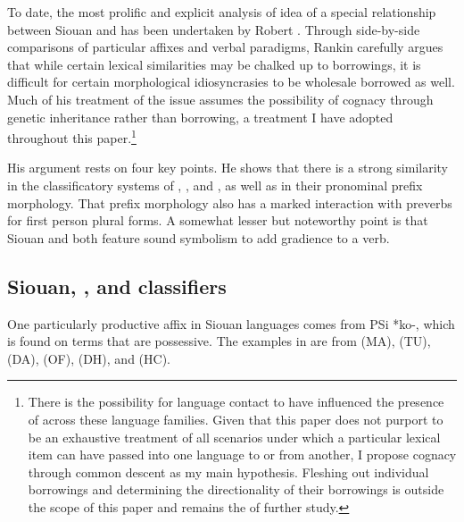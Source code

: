 \documentclass[output=paper]{LSP/langsci}
\begin{document}
To date, the most prolific and explicit analysis of  idea of a special relationship between Siouan and  has been undertaken by Robert \citet{Rankin1996,Rankin1998scy}. Through side-by-side comparisons of particular affixes and verbal paradigms, Rankin carefully argues that while certain lexical similarities may be chalked up to borrowings, it is difficult for certain morphological idiosyncrasies to be wholesale borrowed as well. Much of his treatment of the issue assumes the possibility of cognacy through genetic inheritance rather than borrowing, a treatment I have adopted throughout this paper.\footnote{There is the possibility for language contact to have influenced the presence of  across these language families. Given that this paper does not purport to be an exhaustive treatment of all scenarios under which a particular lexical item can have passed into one language to or from another, I propose cognacy through common descent as my main hypothesis. Fleshing out individual borrowings and determining the directionality of their borrowings is outside the scope of this paper and remains the  of further study.}

His argument rests on four key points. He shows that there is a strong similarity in the classificatory systems of , , and , as well as in their pronominal prefix morphology. That prefix morphology also has a marked interaction with preverbs for first person plural forms. A somewhat lesser but noteworthy point is that Siouan and  both feature  sound symbolism to add gradience to a verb.

\subsection{Siouan, , and  classifiers}

One particularly productive affix in Siouan languages comes from PSi *ko-, which is found on  terms that are possessive. The examples in  are from  (MA),  (TU),  (DA),  (OF),  (DH), and  (HC).
\end{document}
